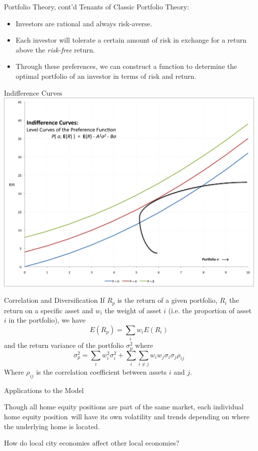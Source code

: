 \documentclass{beamer}
\newcommand{\hep}{home equity position}
\begin{document}
\begin{frame}{Portfolio Theory, cont'd}
Tenants of Classic Portfolio Theory:
\begin{itemize}
\pause
\item
Investors are rational and always risk-averse.
\pause
\item
Each investor will tolerate a certain amount of risk in exchange for a return above the \emph{risk-free} return.
\pause
\item
Through these preferences, we can construct a function to determine the optimal portfolio of an investor in terms of risk and return.
\end{itemize}
\end{frame}

\begin{frame}{Indifference Curves}
\includegraphics[scale = .35]{indiff2.png}
\end{frame}

\begin{frame}{Correlation and Diversification}
If $R_p$ is the return of a given portfolio, $R_i$ the return on a specific asset and $w_i$ the weight of asset $i$ (i.e. the proportion of asset $i$ in the portfolio), we have
$$
E(R_p) = \sum_{i} w_i E(R_i)
$$
and the return variance of the portfolio $\sigma_{p}^2$ where
$$
\sigma_{p}^{2} = \sum_{i} w_{i}^{2} \sigma_{i}^{2} + \sum_{i} \sum_{i\neq j} w_{i}w_{j} \sigma_{i} \sigma_{j} \rho_{ij}
$$
Where $\rho_{ij}$ is the correlation coefficient between assets $i$ and $j$.
\end{frame}


\begin{frame}{Applications to the Model}

 Though all \hep s are part of the same market, each individual \hep\ will have its own volatility and trends depending on where the underlying home is located. \bigskip
 
 How do local city economies affect other local economies?
\end{frame}
\end{document}
